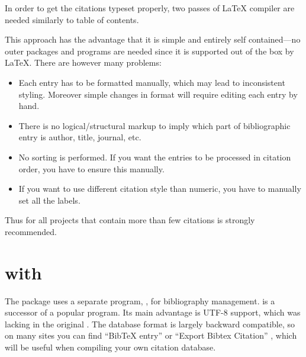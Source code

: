 In order to get the citations typeset properly, two passes of \LaTeX{} compiler
are needed similarly to table of contents.

This approach has the advantage that it is simple and entirely self
contained---no outer packages and programs are needed since it is supported out
of the box by \LaTeX{}. There are however many problems:
\begin{itemize}
  \item Each entry has to be formatted manually, which may lead to inconsistent
  styling. Moreover simple changes in format will require editing each entry by
  hand.
  \item There is no logical/structural markup to imply which part of
  bibliographic entry is author, title, journal, etc.
  \item No sorting is performed. If you want the entries to be processed in
  citation order, you have to ensure this manually.
  \item If you want to use different citation style than numeric, you have to
  manually set all the labels.
\end{itemize}
Thus for all projects that contain more than few citations  is
strongly recommended.


\section{ with }

The  package uses a separate program, , for
bibliography management.  is a successor of a popular
 program. Its main advantage is UTF-8 support, which was lacking
in the original . The database format is largely backward
compatible, so on many sites you can find ``BibTeX entry'' or ``Export Bibtex
Citation'' , which will be useful when compiling your own citation database.

